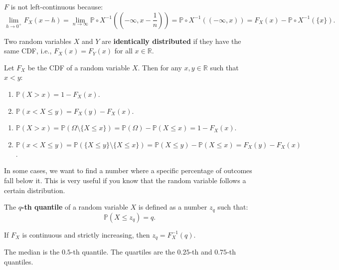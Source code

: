 \documentclass{huhtakm-template-book-v2}
\newcommand{\prob}{\mathbb{P}}
\begin{document}
    \begin{rem}
        $F$ is not left-continuous because:
        \begin{equation*}
            \lim_{h \to 0^{+}}F_{X}(x-h) = \lim_{n \to \infty}\prob \circ X^{-1}\left(\left(-\infty,x-\frac{1}{n}\right)\right) = \prob \circ X^{-1}((-\infty,x)) = F_{X}(x)-\prob \circ X^{-1}(\{x\}).
        \end{equation*}
    \end{rem}
    \begin{rem}
        Two random variables $X$ and $Y$ are \textbf{identically distributed} if they have the same CDF, i.e., $F_{X}(x) = F_{Y}(x)$ for all $x \in \mathbb{R}$.
    \end{rem}
    \begin{lem}
        Let $F_{X}$ be the CDF of a random variable $X$. Then for any $x,y \in \mathbb{R}$ such that $x < y$:
        \begin{enumerate}
            \item $\prob(X > x) = 1-F_{X}(x)$.
            \item $\prob(x < X \leq y) = F_{X}(y)-F_{X}(x)$.
        \end{enumerate}
    \end{lem}
    \begin{proofing}
        \begin{enumerate}
            \item $\prob(X > x) = \prob(\Omega\setminus\{X \leq x\}) = \prob(\Omega)-\prob(X \leq x) = 1-F_{X}(x)$.
            \item $\prob(x < X \leq y) = \prob(\{X \leq y\}\setminus\{X \leq x\}) = \prob(X \leq y)-\prob(X \leq x) = F_{X}(y)-F_{X}(x)$.
        \end{enumerate}
    \end{proofing}
    In some cases, we want to find a number where a specific percentage of outcomes fall below it. This is very useful if you know that the random variable follows a certain distribution.
    \begin{defn}
        The \textbf{$q$-th quantile} of a random variable $X$ is defined as a number $z_{q}$ such that:
        \begin{equation*}
            \prob(X \leq z_{q}) = q.
        \end{equation*}
    \end{defn}
    \begin{rem}
        If $F_{X}$ is continuous and strictly increasing, then $z_{q} = F_{X}^{-1}(q)$.
    \end{rem}
    \begin{eg}
        The median is the $0.5$-th quantile. The quartiles are the $0.25$-th and $0.75$-th quantiles.
    \end{eg}
    \newpage
\end{document}
